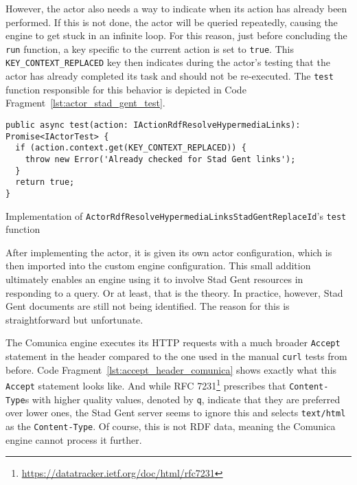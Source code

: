 However, the actor also needs a way to indicate when its action has already been performed. If this is not done, the actor will be queried repeatedly, causing the engine to get stuck in an infinite loop. For this reason, just before concluding the \texttt{run} function, a key specific to the current action is set to \texttt{true}. This \texttt{KEY_CONTEXT_REPLACED} key then indicates during the actor's testing that the actor has already completed its task and should not be re-executed. The \texttt{test} function responsible for this behavior is depicted in Code Fragment~\ref{lst:actor_stad_gent_test}.

\begin{listing}[htbp]
    \begin{verbatim}
public async test(action: IActionRdfResolveHypermediaLinks): Promise<IActorTest> {
  if (action.context.get(KEY_CONTEXT_REPLACED)) {
    throw new Error('Already checked for Stad Gent links');
  }
  return true;
}
    \end{verbatim}
    \caption{Implementation of \texttt{ActorRdfResolveHypermediaLinksStadGentReplaceId}'s \texttt{test} function}
    \label{lst:actor_stad_gent_test}
\end{listing}

After implementing the actor, it is given its own actor configuration, which is then imported into the custom engine configuration. This small addition ultimately enables an engine using it to involve Stad Gent resources in responding to a query. Or at least, that is the theory. In practice, however, Stad Gent documents are still not being identified. The reason for this is straightforward but unfortunate.

The Comunica engine executes its HTTP requests with a much broader \texttt{Accept} statement in the header compared to the one used in the manual \texttt{curl} tests from before. Code Fragment~\ref{lst:accept_header_comunica} shows exactly what this \texttt{Accept} statement looks like. And while RFC 7231\footnote{\url{https://datatracker.ietf.org/doc/html/rfc7231}} prescribes that \texttt{Content-Type}s with higher quality values, denoted by \texttt{q}, indicate that they are preferred over lower ones, the Stad Gent server seems to ignore this and selects \texttt{text/html} as the \texttt{Content-Type}. Of course, this is not RDF data, meaning the Comunica engine cannot process it further. \citep{fielding2014http}

